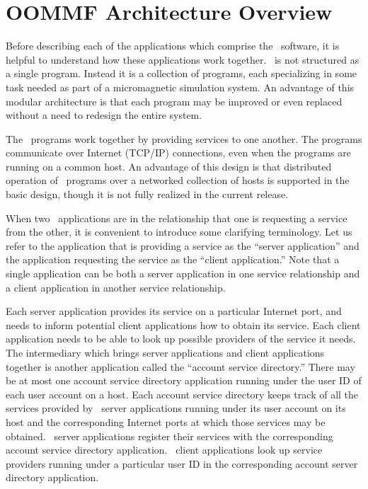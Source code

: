 
\section{OOMMF Architecture Overview}\label{sec:arch}

Before describing each of the applications which comprise
the \OOMMF\ software, it is helpful to understand how these
applications work together.  \OOMMF\ is not structured as
a single program.  Instead it is a collection of programs,
each specializing in some task needed as part of a
micromagnetic simulation system.  An advantage of this modular
architecture is that each program may be improved or even replaced 
without a need to redesign the entire system.

The \OOMMF\  programs work together by providing services
to one another.  
The programs communicate over Internet
(TCP/IP) connections,
even when the programs are running on a common host.  An advantage
of this design is that distributed operation of \OOMMF\ programs
over a networked collection of hosts is supported in the basic
design, though it is not fully realized in the current release.  

%
When two \OOMMF\ applications are in
the relationship that one is requesting a service from the other,
it is convenient to introduce some clarifying terminology.  Let
us refer to the application that is providing a service as
the ``server application'' and the application requesting the
service as the ``client application.''  
Note that a single application
can be both a server application in one service relationship and a 
client application in another service relationship.  

Each server application provides its service on a particular
Internet port, and needs to inform potential client applications 
how to obtain its service.  Each client application needs to be able
to look up possible providers of the service it needs.  The
intermediary which brings server applications and client applications
together is another application called the 
``account service directory.''
There may be at most one account service directory application 
running under the user ID of each user account on a host.
Each account service directory keeps track of all the services provided
by \OOMMF\ server applications running under its user account on its
host and the corresponding Internet ports at which those services
may be obtained.
\OOMMF\ server applications register their services with
the corresponding account service directory application.  \OOMMF\
client applications look up service providers running under a 
particular user ID in the corresponding account server directory 
application.  

